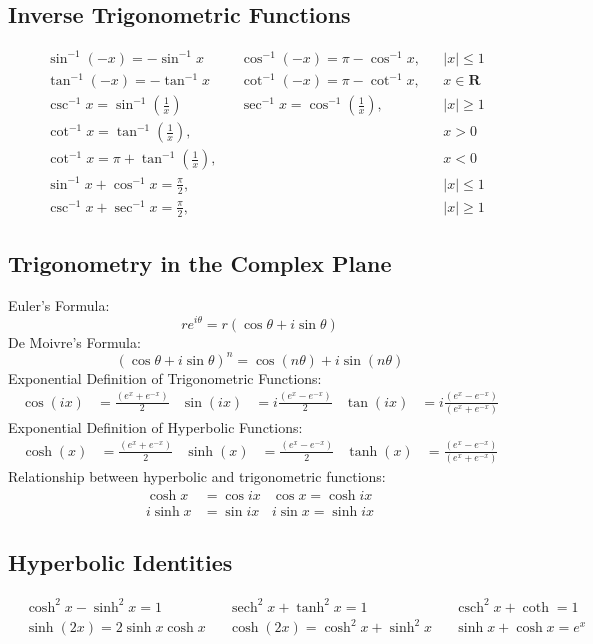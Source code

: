 \documentclass[12pt]{article}
\DeclareMathOperator{\sech}{sech}
\DeclareMathOperator{\csch}{csch}
\begin{document}
\subsection{Inverse Trigonometric Functions}
\begin{align*}
	&\sin^{-1}(-x) =-\sin^{-1}x &   &\cos^{-1}(-x) =\pi-\cos^{-1}x, & &\lvert x\rvert\leq 1 \\
	&\tan^{-1}(-x) =-\tan^{-1}x &   &\cot^{-1}(-x) =\pi-\cot^{-1}x,& &x\in\mathbf{R} \\ 
	&\csc^{-1}x =\sin^{-1}\left(\frac{1}{x}\right) & &\sec^{-1}x =\cos^{-1}\left(\frac{1}{x}\right),& &\lvert x\rvert\geq1 \\ &\cot^{-1}x =\tan^{-1}\left(\frac{1}{x}\right),& & & &x>0 \\ 
	&\cot^{-1}x =\pi+\tan^{-1}\left(\frac{1}{x}\right),& & & &x<0 \\ 
	&\sin^{-1}x+\cos^{-1}x =\frac{\pi}{2},& & &  &\lvert x\rvert\leq1 \\ 
	&\csc^{-1}x+\sec^{-1}x =\frac{\pi}{2},& & & &\lvert x\rvert\geq1 
\end{align*}



\subsection{Trigonometry in the Complex Plane}
Euler's Formula:
$$re^{i\theta} = r(\cos\theta + i\sin\theta)$$
De Moivre's Formula:
$${(\cos\theta + i\sin\theta)}^n = \cos{(n\theta)} + i\sin{(n\theta)}$$
Exponential Definition of Trigonometric Functions:
\begin{align*}
\cos{(ix)} &= \frac{(e^x + e^{-x})}{2} & \sin{(ix)} &= i\frac{(e^x - e^{-x})}{2} & \tan{(ix)} &= i\frac{(e^x - e^{-x})}{(e^x + e^{-x})}
\end{align*}
Exponential Definition of Hyperbolic Functions:
\begin{align*}
\cosh{(x)} &= \frac{(e^x + e^{-x})}{2} & \sinh{(x)} &= \frac{(e^x - e^{-x})}{2} & \tanh{(x)} &= \frac{(e^x - e^{-x})}{(e^x + e^{-x})}
\end{align*}
Relationship between hyperbolic and trigonometric functions:
\begin{align*}
\cosh x &= \cos{ix} & \cos x = \cosh{ix} \\
i\sinh x &= \sin{ix} & i\sin{x} = \sinh{ix} 
\end{align*}

\subsection{Hyperbolic Identities}
\begin{align*}
&\cosh^2 x - \sinh^2 x = 1 & &\sech^2x + \tanh^2x = 1 & &\csch^2x + \coth = 1\\
&\sinh{(2x)} = 2\sinh x\cosh x & &\cosh{(2x)} = \cosh^2x + \sinh^2{x} & &\sinh x + \cosh x = e^x \\
\end{align*}
\end{document}
